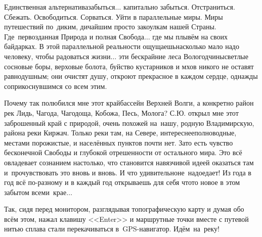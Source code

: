 
Единственная альтернатива\mdash забыться$\ldots$ капитально забыться. Отстраниться. Сбежать. Освободиться. Сорваться. Уйти в параллельные миры. Миры путешествий по~диким, дичайшим просто закоулкам нашей Страны. Где~первозданная Природа и полная Свобода$\ldots$ где мы плывём на своих байдарках. В этой параллельной реальности ощущаешь\mdash насколько мало надо человеку, чтобы радоваться жизни$\ldots$ эти бескрайние леса Вологодчины\mdash светлые сосновые боры, верховые болота, буйство кустарников и мхов никого не оставят равнодушным; они очистят душу, откроют прекрасное в каждом сердце, однажды соприкоснувшимся со всем этим. 

Почему так полюбился мне этот край\mdash бассейн Верхней Волги, а конкретно район рек Лидь, Чагода, Чагодоща, Кобожа, Песь, Молога? С.Ю. открыл мне этот заброшенный край с природой, очень похожей на~нашу, родную Владимирскую, района реки Киржач. Только реки там, на Севере, интереснее\mdash полноводные, местами порожистые, и населённых пунктов почти нет. Зато есть чувство бесконечной Свободы и глубокой отрешенности от остального мира. Это всё овладевает сознанием настолько, что становится навязчивой идеей оказаться там и~прочувствовать это вновь и вновь. И что удивительно\mdash не~надоедает! Из года в год всё по-разному и в каждый год открываешь для себя что\sdash то новое в этом забытом всеми~крае$\ldots$
 
Так, сидя перед монитором, разглядывая топографическую карту и думая обо всём этом, 
нажал клавишу <<Enter>> и маршрутные точки вместе с путевой нитью сплава стали перекачиваться в~GPS-навигатор. Идём~на~реку!%

\begin{center}
\end{center}
